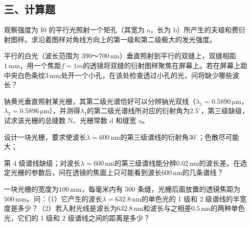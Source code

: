 \documentclass[padl, analysis, notocnum]{ExBook}
\newcommand{\answerarea}[1][3.5cm]{%
  \par\vspace{1mm}%
  \noindent{\color{themeColor!35}\rule{\linewidth}{0.4pt}}\par
  \noindent\begin{minipage}[t][#1][t]{\linewidth}\vspace{0pt}\end{minipage}\par
  \noindent{\color{themeColor!35}\rule{\linewidth}{0.4pt}}\par
}
\begin{document}
\subsection{三、计算题}
\begin{qitems}[startnum=1]
\qitem 观察强度为 I0 的平行光照射一个矩孔（其宽为 a，长为 b）所产生的夫琅和费衍射图样。求沿着图样对角线方向上的第一级和第二级极大的发光强度。
\label{q:290:start}
\answerarea[7.0cm]
\label{q:290:end}
\end{qitems}

\begin{qitems}[startnum=2]
\qitem 平行的白光（波长范围为 390～$700\,\mathrm{nm}$）垂直照射到平行的双缝上，双缝相距$1\,\mathrm{mm}$，用一个焦距$f=1m$的透镜将双缝的衍射图样聚焦在屏幕上。若在屏幕上距中央白色条纹$3\,\mathrm{mm}$处开一个小孔，在该处检查透过小孔的光，问将缺少哪些波长？
\label{q:291:start}
\answerarea[7.0cm]
\label{q:291:end}
\end{qitems}

\begin{qitems}[startnum=3]
\qitem 钠黄光垂直照射某光栅，其第二级光谱恰好可以分辨钠光双线（$\lambda_{1}=0.5890\,\mathrm{\mu m}$，$\lambda_{2}=0.5896\,\mathrm{\mu m}$），并测得$\lambda_{1}$的第二级光谱线所对应的衍射角为$2.5^{\circ}$，第三级缺级，试求该光栅的总缝数 N、光栅常数 d 和缝宽 a。
\label{q:292:start}
\answerarea[7.0cm]
\label{q:292:end}
\end{qitems}

\begin{qitems}[startnum=4]
\qitem 设计一块光栅，要求使波长$\lambda =600\,\mathrm{nm}$的第三级谱线的衍射角$30^{\circ}$；色散尽可能大；
\par\noindent\hspace{2em}第 4 级谱线缺级；对波长$\lambda =600\,\mathrm{nm}$的第三级谱线能分辨$0.02\,\mathrm{nm}$的波长差。在选定光栅的参数后，问在透镜的焦面上只可能看到波长$600\,\mathrm{nm}$的几条谱线？
\label{q:293:start}
\answerarea[7.0cm]
\label{q:293:end}
\end{qitems}

\begin{qitems}[startnum=5]
\qitem 一块光栅的宽度为$100\,\mathrm{mm}$，每毫米内有 500 条缝，光栅后面放置的透镜焦距为$500\,\mathrm{mm}$。问：（1）它产生的波长$\lambda =632.8\,\mathrm{nm}$的单色光的 1 级和 2 级谱线的半宽度是多少？（2）若入射光线是波长为$632.8\,\mathrm{nm}$和波长与之相差$0.5\,\mathrm{nm}$的两种单色光，它们的 1 级和 2 级谱线之间的距离是多少？
\label{q:294:start}
\answerarea[7.0cm]
\label{q:294:end}
\end{qitems}
\end{document}
